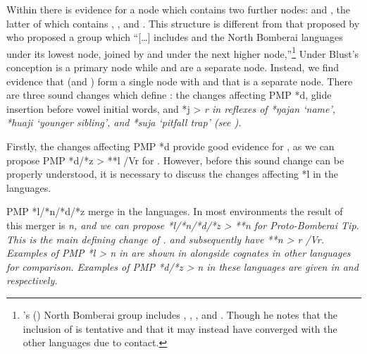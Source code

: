 Within  there is evidence for a  node which contains two further nodes: 
and , the latter of which contains , , and .
This structure is different from that proposed by \citet[279]{Blust1993}
who proposed a group which “[{\ldots}] includes 
and the North Bomberai languages under its lowest node,
joined by  and  under the next higher node,”\footnote{
		\citeauthor{Blust1993}'s (\citeyear[273f]{Blust1993})
		North Bomberai group includes ,
		, , and .
		Though he notes that the inclusion of  is tentative
		and that it may instead have converged with the other languages
		due to contact.}
Under Blust’s conception  is a primary
node while  and  are a separate node.
Instead, we find evidence that  (and ) form a single
node with 
and that  is a separate node.
There are three sound changes which define :
the changes affecting PMP *d,
glide insertion before vowel initial words,
and *j > \it{r} in reflexes of *ŋajan ‘name’,
*huaji ‘younger sibling’, and *suja ‘pitfall trap’ (see ).

Firstly, the changes affecting PMP *d provide good evidence for
, as we can propose PMP *d/*z > **l /{\gap}Vr for .
However, before this sound change can be properly understood,
it is necessary to discuss the changes affecting *l in the  languages.

PMP *l/*n/*d/*z merge in the  languages.
In most environments the result of this merger is \it{n},
and we can propose *l/*n/*d/*z > **n for Proto-Bomberai Tip.
This is the main defining change of .
 and  subsequently have **n > \it{r} /{\gap}Vr.
Examples of PMP *l > \it{n} in  are shown in
 alongside cognates in other  languages for comparison.
Examples of PMP *d/*z > \it{n} in these languages are given in
 and  respectively.

